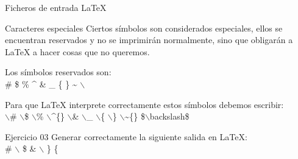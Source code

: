 \documentclass[10pt]{beamer}
\begin{document}
\begin{frame}{Ficheros de entrada \LaTeX{}}
	\begin{block}{Caracteres especiales}
		Ciertos símbolos son considerados especiales, ellos se encuentran reservados y no se imprimirán normalmente, sino que obligarán a \LaTeX{} a hacer cosas que no queremos.

		Los símbolos reservados son: \\
\# \hspace*{1em} \$ \hspace*{1em} \% \hspace*{1em} \^{} \hspace*{1em} \& \hspace*{1em} \_ \hspace*{1em} \{ \hspace*{1em} \} \hspace*{1em} \~{} \hspace*{1em} $\backslash$

		Para que \LaTeX{} interprete correctamente estos símbolos debemos escribir: \\
$\backslash$\# \hspace*{.7em} $\backslash$\$ \hspace*{.7em} $\backslash$\% \hspace*{.7em} $\backslash$\^{}\{\} \hspace*{.7em} $\backslash$\& \hspace*{.7em} $\backslash$\_ \hspace*{.7em} $\backslash$\{ \hspace*{.7em} $\backslash$\} \hspace*{.7em} $\backslash$\~{}\{\} \hspace*{.7em} \$$\backslash$backslash\$
	\end{block}
	\begin{exampleblock}{Ejercicio 03}
		Generar correctamente la siguiente salida en \LaTeX{}: \\
		\# $\backslash$ \$ \& $\backslash$ 	\} \{
	\end{exampleblock}
\end{frame}
\end{document}

